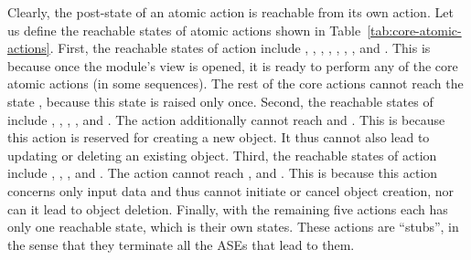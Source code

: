 {%

Clearly, the post-state of an atomic action is reachable from its own action. Let us define the reachable states of atomic actions shown in Table~\ref{tab:core-atomic-actions}. First, the reachable states of action  include , , , , , , , and . This is because once the module's view is opened, it is ready to perform any of the core atomic actions (in some sequences). The rest of the core actions cannot reach the state , because this state is raised only once. Second, the reachable states of  include , , , , and . The action 
 additionally cannot reach  and . This is because this action is reserved for creating a new object. It thus cannot also lead to updating or deleting an existing object.
Third, the reachable states of action  include , , , and . The action  cannot reach ,  and . This is because this action concerns only input data and thus cannot initiate or cancel object creation, nor can it lead to object deletion.
%
Finally, with the remaining five actions each has only one reachable state, which is their own states. These actions are ``stubs'', in the sense that they terminate all the ASEs that lead to them.

}
